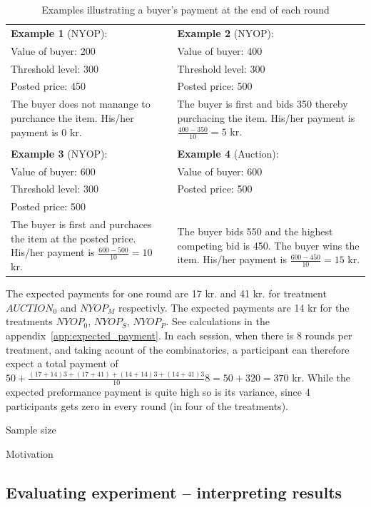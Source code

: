 \documentclass[a4paper,12pt]{article}
\begin{document}
	\begin{table}[ht]
		\caption{Examples illustrating a buyer's payment at the end of each round}
		\begin{tabular}{p{}  p{}}
			{\bf Example 1} (NYOP): 	& {\bf Example 2} (NYOP):  		\\
			Value of buyer: 200 		& Value of buyer: 400 			\\
			Threshold level: 300 		& Threshold level: 300 			\\
			Posted price: 450 			& Posted price: 500 			\\
			The buyer does not manange to purchance the item. His/her payment is 0 kr. & The buyer is first and bids 350 thereby purchacing the item. His/her payment is $\frac{400-350}{10}=5$ kr. \\
			\multicolumn{2}{c}{} \\
			{\bf Example 3} (NYOP):  	& {\bf Example 4} (Auction): 	\\
			Value of buyer: 600 		& Value of buyer: 600  			\\
			Threshold level: 300  		& Posted price: 500  			\\
			Posted price: 500  			&  								\\
			The buyer is first and purchaces the item at the posted price. His/her payment is $\frac{600-500}{10}=10$ kr. & The buyer bids 550 and the highest competing bid is 450. The buyer wins the item. His/her payment is $\frac{600-450}{10}=15$ kr. \\
		\end{tabular}
		\label{tab:payment}
	\end{table}
	
	The expected payments for one round are 17 kr. and 41 kr. for treatment $AUCTION_0$ and $NYOP_M$ respectivly. The expected payments are 14 kr for the treatments $NYOP_0$, $NYOP_S$, $NYOP_P$. See calculations in the appendix~\ref{app:expected_payment}. In each session, when there is 8 rounds per treatment, and taking acount of the combinatorics, a participant can therefore expect a total payment of $50 + \frac{(17+14)3 + (17+41) + (14+14)3 + (14+41)3}{10}8 = 50 + 320 = 370$ kr. While the expected preformance payment is quite high so is its variance, since 4 participants gets zero in every round (in four of the treatments).

	Sample size
	
	Motivation

	\subsection{Evaluating experiment -- interpreting results}
	
\end{document}
